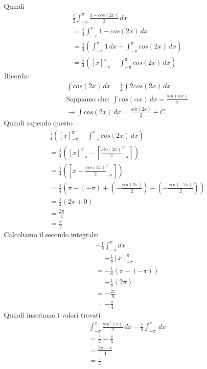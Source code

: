 \documentclass{article}
\begin{document}
Quindi
\begin{align*}
    \frac{1}{2}\int_{-\pi}^{\pi} \frac{1-cos(2x)}{2} \,dx \\
    = \frac{1}{4}\int_{-\pi}^{\pi} 1-cos(2x) \,dx \\
    = \frac{1}{4}(\int_{-\pi}^{\pi} 1 \,dx - \int_{-\pi}^{\pi} cos(2x) \,dx) \\
    = \frac{1}{4}([x]_{-\pi}^{\pi} - \int_{-\pi}^{\pi} cos(2x) \,dx)
\end{align*}
Ricorda:
\begin{align*}
    \int cos(2x) \, dx = \frac{1}{2}\int 2cos(2x) \,dx \\
    \text{Sappiamo che: } \int cos(\alpha x) \, dx = \frac{sin(\alpha x)}{\alpha} \\
    \to \int cos(2x) \, dx = \frac{sin(2x)}{2}+C
\end{align*}
Quindi sapendo questo
\begin{align*}
    \frac{1}{4}([x]_{-\pi}^{\pi} - \int_{-\pi}^{\pi} cos(2x) \,dx) \\ 
    = \frac{1}{4}([x]_{-\pi}^{\pi} - [\frac{sin(2x)}{2}_{-\pi}^{\pi}]) \\
    = \frac{1}{4}( [x-\frac{sin(2x)}{2}_{-\pi}^{\pi}]) \\
    = \frac{1}{4}(\pi-(-\pi) + (-\frac{sin(2\pi)}{2})-(-\frac{sin(-2\pi)}{2})) \\
    = \frac{1}{4}(2\pi + 0) \\
    = \frac{2\pi}{4} \\
    = \frac{\pi}{2}
\end{align*}
Calcoliamo il secondo integrale:
\begin{align*}
    -\frac{1}{8}\int_{-\pi}^{\pi}dx \\
    = -\frac{1}{8}[x]_{-\pi}^{\pi} \\
    = -\frac{1}{8}(\pi - (-\pi)) \\
    = -\frac{1}{8}(2\pi) \\
    = -\frac{2\pi}{8} \\
    = -\frac{\pi}{4}
\end{align*}
Quindi inseriamo i valori trovati
\begin{align*}
    \int_{-\pi}^{\pi} \frac{sin^2(x)}{2} \,dx -\frac{1}{8} \int_{-\pi}^{\pi}  \,dx \\
    = \frac{\pi}{2} - \frac{\pi}{4} \\
    = \frac{2\pi - \pi}{4}\\
    = \frac{\pi}{4}
\end{align*}
\end{document}
